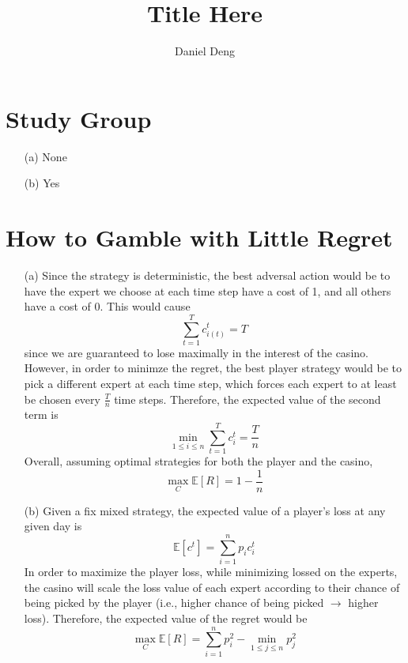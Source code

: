 \documentclass[11pt]{article}
\title{Title Here}
\author{Daniel Deng}
\date{}
\theoremstyle{definition}
\theoremstyle{remark}
\begin{document}
\maketitle

\section{Study Group}
\begin{enumerate}
\item[(a)] None
\item[(b)] Yes
\end{enumerate}
\clearpage

\section{How to Gamble with Little Regret}
\begin{enumerate}
\item[(a)] Since the strategy is deterministic, the best adversal action would be to have the expert we choose at each time step have a cost of 1, and all others have a cost of 0. This would cause
\[
\sum_{t=1}^T c_{i(t)}^t = T
\]
since we are guaranteed to lose maximally in the interest of the casino. However, in order to minimze the regret, the best player strategy would be to pick a different expert at each time step, which forces each expert to at least be chosen every $\frac{T}{n}$ time steps. Therefore, the expected value of the second term is
\[
\min_{1\leq i \leq n} \sum_{t=1}^T c_i^t = \frac{T}{n}
\]
Overall, assuming optimal strategies for both the player and the casino,
\[
\max_C \mathbb{E}[R] = 1 - \frac{1}{n}
\]

\item[(b)] Given a fix mixed strategy, the expected value of a player's loss at any given day is
\[
\mathbb{E}[c^t] = \sum_{i = 1}^n p_i c_i^t
\]
In order to maximize the player loss, while minimizing lossed on the experts, the casino will scale the loss value of each expert according to their chance of being picked by the player (i.e., higher chance of being picked $\to$ higher loss). Therefore, the expected value of the regret would be
\[
\max_C \mathbb{E}[R] = \sum_{i=1}^n p_i^2 - \min_{1\leq j\leq n} p_j^2
\]

\end{enumerate}
\end{document}
